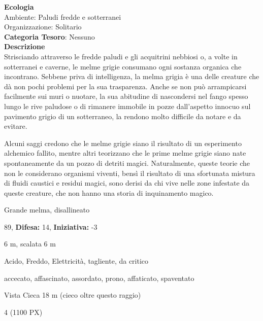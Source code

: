 \begin{multicols}{2}
{\textbf{Ecologia}\\
Ambiente: Paludi fredde e sotterranei\\
Organizzazione: Solitario\\
\textbf{Categoria Tesoro}: Nessuno\\
\textbf{Descrizione}\\
Strisciando attraverso le fredde paludi e gli acquitrini nebbiosi o, a volte in sotterranei e caverne, le melme grigie consumano ogni sostanza organica che incontrano. Sebbene priva di intelligenza, la melma grigia è una delle creature che dà non pochi problemi per la sua trasparenza. Anche se non può arrampicarsi facilmente sui muri o nuotare, la sua abitudine di nascondersi nel fango spesso lungo le rive paludose o di rimanere immobile in pozze dall'aspetto innocuo sul pavimento grigio di un sotterraneo, la rendono molto difficile da notare e da evitare.

Alcuni saggi credono che le melme grigie siano il risultato di un esperimento alchemico fallito, mentre altri teorizzano che le prime melme grigie siano nate spontaneamente da un pozzo di detriti magici. Naturalmente, queste teorie che non le considerano organismi viventi, bensì il risultato di una sfortunata mistura di fluidi caustici e residui magici, sono derisi da chi vive nelle zone infestate da queste creature, che non hanno una storia di inquinamento magico.

\noindent
\begin{description}[noitemsep, topsep=0pt, parsep=0pt, partopsep=0pt, leftmargin=0cm, labelwidth=2.2cm]
	\item[\textbf{Taglia/Tipo:}] Grande melma, disallineato
	\item[\textbf{Caratt.:}] 
	\item[\textbf{Punti Ferita:}] 89,  \textbf{Difesa:} 14,  \textbf{Iniziativa:} -3
	\item[\textbf{Movimento:}] 6 m, scalata 6 m
	\item[\textbf{Tiri Salvez.:}] 
	\item[\textbf{Imm. Danni:}] Acido, Freddo, Elettricità, tagliente, da critico
	\item[\textbf{Immunità:}] accecato, affascinato, assordato, prono, affaticato, spaventato
	\item[\textbf{Sensi:}] Vista Cieca 18 m (cieco oltre questo raggio)
	\item[\textbf{Sfida:}] 4 (1100 PX)\smallskip
\end{description}

}
\end{multicols}
